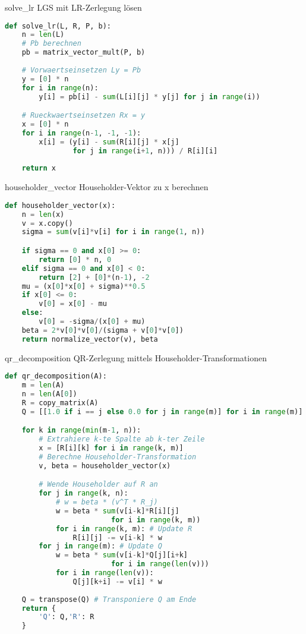 \begin{examplecode}{solve\_lr} LGS mit LR-Zerlegung lösen
\begin{lstlisting}[language=Python, style=basesmol]
def solve_lr(L, R, P, b):
    n = len(L)
    # Pb berechnen
    pb = matrix_vector_mult(P, b)
    
    # Vorwaertseinsetzen Ly = Pb
    y = [0] * n
    for i in range(n):
        y[i] = pb[i] - sum(L[i][j] * y[j] for j in range(i))

    # Rueckwaertseinsetzen Rx = y
    x = [0] * n
    for i in range(n-1, -1, -1):
        x[i] = (y[i] - sum(R[i][j] * x[j] 
                for j in range(i+1, n))) / R[i][i]
                
    return x
\end{lstlisting}
\end{examplecode}

\begin{examplecode}{householder\_vector} Householder-Vektor zu x berechnen
\begin{lstlisting}[language=Python, style=basesmol]
def householder_vector(x):
    n = len(x)
    v = x.copy()
    sigma = sum(v[i]*v[i] for i in range(1, n))

    if sigma == 0 and x[0] >= 0:
        return [0] * n, 0
    elif sigma == 0 and x[0] < 0:
        return [2] + [0]*(n-1), -2
    mu = (x[0]*x[0] + sigma)**0.5
    if x[0] <= 0:
        v[0] = x[0] - mu
    else:
        v[0] = -sigma/(x[0] + mu)
    beta = 2*v[0]*v[0]/(sigma + v[0]*v[0])
    return normalize_vector(v), beta
\end{lstlisting}
\end{examplecode}

\begin{examplecode}{qr\_decomposition} QR-Zerlegung mittels Householder-Transformationen
\begin{lstlisting}[language=Python, style=basesmol]
def qr_decomposition(A):
    m = len(A)
    n = len(A[0])
    R = copy_matrix(A)
    Q = [[1.0 if i == j else 0.0 for j in range(m)] for i in range(m)]

    for k in range(min(m-1, n)):
        # Extrahiere k-te Spalte ab k-ter Zeile
        x = [R[i][k] for i in range(k, m)]
        # Berechne Householder-Transformation
        v, beta = householder_vector(x)

        # Wende Householder auf R an
        for j in range(k, n):
            # w = beta * (v^T * R_j)
            w = beta * sum(v[i-k]*R[i][j] 
                         for i in range(k, m))
            for i in range(k, m): # Update R
                R[i][j] -= v[i-k] * w
        for j in range(m): # Update Q
            w = beta * sum(v[i-k]*Q[j][i+k] 
                         for i in range(len(v)))
            for i in range(len(v)):
                Q[j][k+i] -= v[i] * w
    
    Q = transpose(Q) # Transponiere Q am Ende
    return {
        'Q': Q,'R': R
    }
\end{lstlisting}
\end{examplecode}

